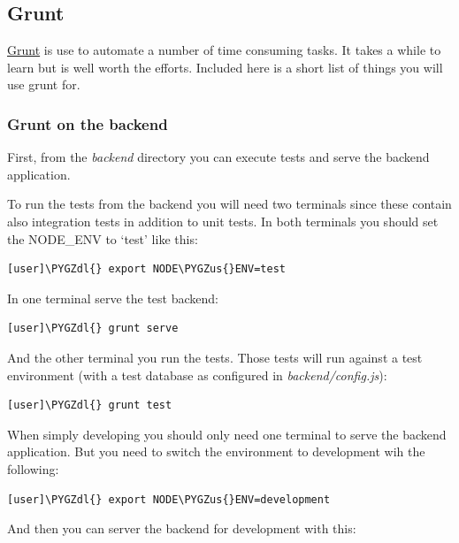 \documentclass[letterpaper,10pt,english]{sphinxmanual}
\def\PYGZus{\char`\_}
\def\PYGZdl{\char`\$}
\begin{document}
\subsection{Grunt}
\label{developer-guide:grunt}
\href{http://gruntjs.com/}{Grunt} is use to automate a number of time
consuming tasks. It takes a while to learn but is well worth the
efforts. Included here is a short list of things you will use grunt
for.


\subsubsection{Grunt on the backend}
\label{developer-guide:grunt-on-the-backend}
First, from the \emph{backend} directory you can execute tests and serve
the backend application.

To run the tests from the backend you will need two terminals since
these contain also integration tests in addition to unit tests. In
both terminals you should set the NODE\_ENV to `test' like this:

\begin{Verbatim}[commandchars=\\\{\}]
[user]\PYGZdl{} export NODE\PYGZus{}ENV=test
\end{Verbatim}

In one terminal serve the test backend:

\begin{Verbatim}[commandchars=\\\{\}]
[user]\PYGZdl{} grunt serve
\end{Verbatim}

And the other terminal you run the tests. Those tests will run against
a test environment (with a test database as configured in
\emph{backend/config.js}):

\begin{Verbatim}[commandchars=\\\{\}]
[user]\PYGZdl{} grunt test
\end{Verbatim}

When simply developing you should only need one terminal to serve the
backend application. But you need to switch the environment to
development wih the following:

\begin{Verbatim}[commandchars=\\\{\}]
[user]\PYGZdl{} export NODE\PYGZus{}ENV=development
\end{Verbatim}

And then you can server the backend for development with this:
\end{document}
